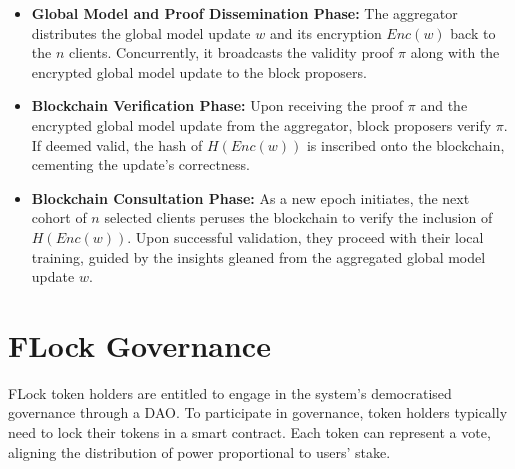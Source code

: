 \documentclass[conference]{IEEEtran}
\newcommand{\FL}{\ac{FL} Alliance\xspace}
\begin{document}
\begin{itemize}
where the corresponding circuit $C(statement, witness)$ outputs $0$ if and only if:

\begin{equation*}
    \begin{cases}
      & \text{$\forall 1\leq i \leq n, Enc(w_i) = g^{w_i} \cdot h^{s_i}$}\\
      & \text{$w = \sum_{i=1}^{n} {w_i}$}\\
       & \text{$sig_i$ is signed by the client $i$}
    \end{cases}       
\end{equation*}
    
    \item \textbf{Global Model and Proof Dissemination Phase:} The aggregator distributes the global model update $w$ and its encryption $Enc(w)$ back to the $n$ clients. Concurrently, it broadcasts the validity proof $\pi$ along with the encrypted global model update to the block proposers.





    \item \textbf{Blockchain Verification Phase:} Upon receiving the proof $\pi$ and the encrypted global model update from the aggregator, block proposers verify $\pi$. If deemed valid, the hash of $H(Enc(w))$ is inscribed onto the blockchain, cementing the update's correctness.
    
    \item \textbf{Blockchain Consultation Phase:} As a new epoch initiates, the next cohort of $n$ selected clients peruses the blockchain to verify the inclusion of $H(Enc(w))$. Upon successful validation, they proceed with their local training, guided by the insights gleaned from the aggregated global model update $w$.
\end{itemize}


\section{FLock Governance}

FLock token holders are entitled to engage in the system's democratised governance through a DAO. To participate in governance, token holders typically need to lock their tokens in a smart contract. Each token can represent a vote, aligning the distribution of power proportional to users' stake.  
\end{document}

